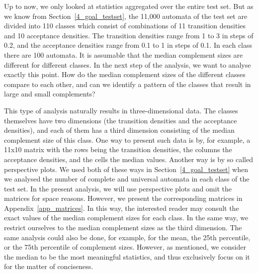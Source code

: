 % 

Up to now, we only looked at statistics aggregated over the entire test set. But as we know from Section~\ref{4_goal_testset}, the 11,000 automata of the \goal{} test set are divided into 110 classes which consist of combinations of 11 transition densities and 10 acceptance densities. The transition densities range from 1 to 3 in steps of 0.2, and the acceptance densities range from 0.1 to 1 in steps of 0.1. In each class there are 100 automata. It is assumable that the median complement sizes are different for different classes. In the next step of the analysis, we want to analyse exactly this point. How do the median complement sizes of the different classes compare to each other, and can we identify a pattern of the classes that result in large and small complements?

This type of analysis naturally results in three-dimensional data. The classes themselves have two dimensions (the transition densities and the acceptance densities), and each of them has a third dimension consisting of the median complement size of this class. One way to present such data is by, for example, a 11x10 matrix with the rows being the transition densities, the columns the acceptance densities, and the cells the median values. Another way is by so called perspective plots. We used both of these ways in Section~\ref{4_goal_testset} when we analysed the number of complete and universal automata in each class of the \goal{} test set. In the present analysis, we will use perspective plots and omit the matrices for space reasons. However, we present the corresponding matrices in Appendix~\ref{app_matrices}. In this way, the interested reader may consult the exact values of the median complement sizes for each class. In the same way, we restrict ourselves to the median complement sizes as the third dimension. The same analysis could also be done, for example, for the mean, the 25th percentile, or the 75th percentile of complement sizes. However, as mentioned, we consider the median to be the most meaningful statistics, and thus exclusively focus on it for the matter of conciseness.

